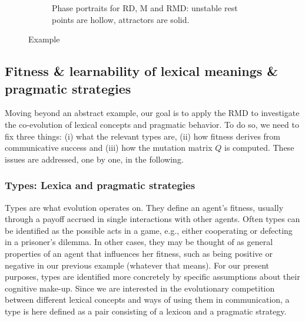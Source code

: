 \documentclass[a4paper, 11pt]{article}
\theoremstyle{Satz}
\begin{document}
\begin{figure}[t]
\begin{subfigure}[b]{0.5\textwidth}
        


    \caption{Phase portraits for RD, M and RMD: unstable rest points are hollow, attractors are
      solid.}
        \label{fig:Phase_RD}
    \end{subfigure}

  \caption{Example}
  \label{fig:Example_RMD}
\end{figure}


\subsection{Fitness \& learnability of lexical meanings \& pragmatic strategies}
\label{sec:fitn--learn}

Moving beyond an abstract example, our goal is to apply the RMD to investigate the co-evolution
of lexical concepts and pragmatic behavior. To do so, we need to fix three things: (i) what the
relevant types are, (ii) how fitness derives from communicative success and (iii) how the
mutation matrix $Q$ is computed. These issues are addressed, one by one, in the following.

\subsubsection{Types: Lexica and pragmatic strategies}
\label{sec:languages+use}

Types are what evolution operates on. They define an agent's fitness, usually through a payoff
accrued in single interactions with other agents. Often types can be identified as the possible
acts in a game, e.g., either cooperating or defecting in a prisoner's dilemma. In other cases,
they may be thought of as general properties of an agent that influences her fitness, such as
being positive or negative in our previous example (whatever that means). For our present
purposes, types are identified more concretely by specific assumptions about their cognitive
make-up. Since we are interested in the evolutionary competition between different lexical
concepts and ways of using them in communication, a type is here defined as a pair consisting
of a lexicon and a pragmatic strategy.
\end{document}
